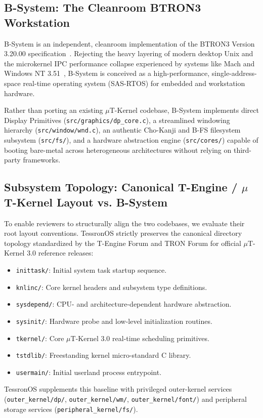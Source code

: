 \documentclass[10pt,journal,compsoc,twocolumn]{article}
\begin{document}
\subsection{B-System: The Cleanroom BTRON3 Workstation}
B-System is an independent, cleanroom implementation of the BTRON3 Version 3.20.00 specification~\cite{btron3spec}. Rejecting the heavy layering of modern desktop Unix and the microkernel IPC performance collapse experienced by systems like Mach and Windows NT 3.51~\cite{cutler1993nt, solomon1998inside}, B-System is conceived as a high-performance, single-address-space real-time operating system (SAS-RTOS) for embedded and workstation hardware.

Rather than porting an existing $\mu$T-Kernel codebase, B-System implements direct Display Primitives (\texttt{src/graphics/dp\_core.c}), a streamlined windowing hierarchy (\texttt{src/window/wnd.c}), an authentic Cho-Kanji and B-FS filesystem subsystem (\texttt{src/fs/}), and a hardware abstraction engine (\texttt{src/cores/}) capable of booting bare-metal across heterogeneous architectures without relying on third-party frameworks.

\subsection{Subsystem Topology: Canonical T-Engine / $\mu$T-Kernel Layout vs. B-System}
\label{sec:subsystem_topology}

To enable reviewers to structurally align the two codebases, we evaluate their root layout conventions. TessronOS strictly preserves the canonical directory topology standardized by the T-Engine Forum and TRON Forum for official $\mu$T-Kernel 3.0 reference releases:
\begin{itemize}[leftmargin=*]
    \item \texttt{inittask/}: Initial system task startup sequence.
    \item \texttt{knlinc/}: Core kernel headers and subsystem type definitions.
    \item \texttt{sysdepend/}: CPU- and architecture-dependent hardware abstraction.
    \item \texttt{sysinit/}: Hardware probe and low-level initialization routines.
    \item \texttt{tkernel/}: Core $\mu$T-Kernel 3.0 real-time scheduling primitives.
    \item \texttt{tstdlib/}: Freestanding kernel micro-standard C library.
    \item \texttt{usermain/}: Initial userland process entrypoint.
\end{itemize}
TessronOS supplements this baseline with privileged outer-kernel services (\texttt{outer\_kernel/dp/}, \texttt{outer\_kernel/wm/}, \texttt{outer\_kernel/font/}) and peripheral storage services (\texttt{peripheral\_kernel/fs/}).
\end{document}
